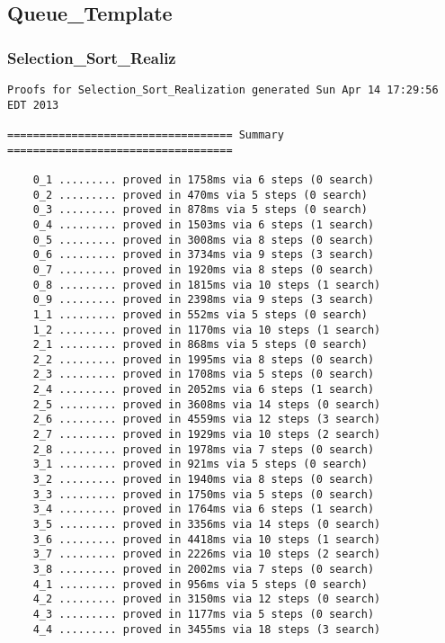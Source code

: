 	\subsection{Queue\_Template}	%

		\subsubsection{Selection\_Sort\_Realiz}	%

\begin{lstlisting}[language=resolve]
Proofs for Selection_Sort_Realization generated Sun Apr 14 17:29:56 EDT 2013

=================================== Summary ===================================

	0_1	......... proved in 1758ms via 6 steps (0 search)
	0_2	......... proved in 470ms via 5 steps (0 search)
	0_3	......... proved in 878ms via 5 steps (0 search)
	0_4	......... proved in 1503ms via 6 steps (1 search)
	0_5	......... proved in 3008ms via 8 steps (0 search)
	0_6	......... proved in 3734ms via 9 steps (3 search)
	0_7	......... proved in 1920ms via 8 steps (0 search)
	0_8	......... proved in 1815ms via 10 steps (1 search)
	0_9	......... proved in 2398ms via 9 steps (3 search)
	1_1	......... proved in 552ms via 5 steps (0 search)
	1_2	......... proved in 1170ms via 10 steps (1 search)
	2_1	......... proved in 868ms via 5 steps (0 search)
	2_2	......... proved in 1995ms via 8 steps (0 search)
	2_3	......... proved in 1708ms via 5 steps (0 search)
	2_4	......... proved in 2052ms via 6 steps (1 search)
	2_5	......... proved in 3608ms via 14 steps (0 search)
	2_6	......... proved in 4559ms via 12 steps (3 search)
	2_7	......... proved in 1929ms via 10 steps (2 search)
	2_8	......... proved in 1978ms via 7 steps (0 search)
	3_1	......... proved in 921ms via 5 steps (0 search)
	3_2	......... proved in 1940ms via 8 steps (0 search)
	3_3	......... proved in 1750ms via 5 steps (0 search)
	3_4	......... proved in 1764ms via 6 steps (1 search)
	3_5	......... proved in 3356ms via 14 steps (0 search)
	3_6	......... proved in 4418ms via 10 steps (1 search)
	3_7	......... proved in 2226ms via 10 steps (2 search)
	3_8	......... proved in 2002ms via 7 steps (0 search)
	4_1	......... proved in 956ms via 5 steps (0 search)
	4_2	......... proved in 3150ms via 12 steps (0 search)
	4_3	......... proved in 1177ms via 5 steps (0 search)
	4_4	......... proved in 3455ms via 18 steps (3 search)


\end{lstlisting}
